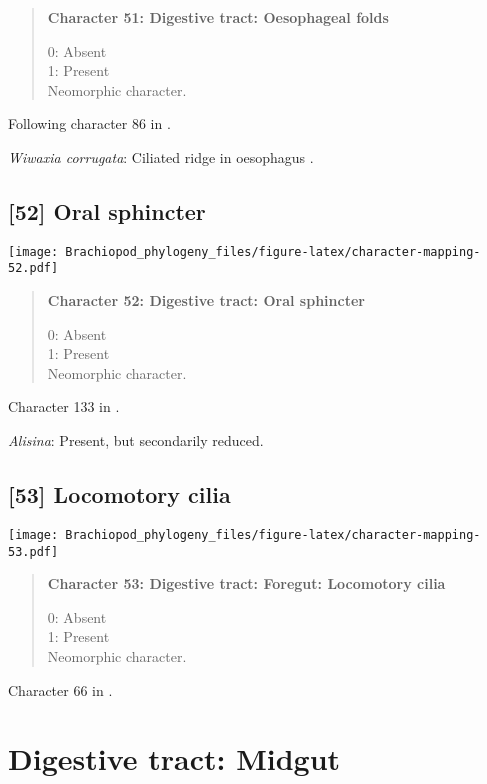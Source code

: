 \documentclass[openany]{book}
\theoremstyle{definition}
\theoremstyle{definition}
\theoremstyle{definition}
\theoremstyle{remark}
\begin{document}
\begin{quote}
\textbf{Character 51: Digestive tract: Oesophageal folds}

0: Absent\\
1: Present\\
Neomorphic character.
\end{quote}

Following character 86 in \citet{Giribet2002}.

\hypertarget{Wiwaxia_corrugata-coding-51}{}
\emph{Wiwaxia corrugata}: Ciliated ridge in oesophagus
\citep{Torrey1901}.

\subsection*{{[}52{]} Oral sphincter}\label{oral-sphincter}

\texttt{[image: Brachiopod\_phylogeny\_files/figure-latex/character-mapping-52.pdf]}

\begin{quote}
\textbf{Character 52: Digestive tract: Oral sphincter}

0: Absent\\
1: Present\\
Neomorphic character.
\end{quote}

Character 133 in \citet{Grobe2007}.

\hypertarget{Alisina-coding-52}{}
\emph{Alisina}: Present, but secondarily reduced.

\subsection*{{[}53{]} Locomotory cilia}\label{locomotory-cilia}

\texttt{[image: Brachiopod\_phylogeny\_files/figure-latex/character-mapping-53.pdf]}

\begin{quote}
\textbf{Character 53: Digestive tract: Foregut: Locomotory cilia}

0: Absent\\
1: Present\\
Neomorphic character.
\end{quote}

Character 66 in \citet{Haszprunar2000}.

\section{Digestive tract: Midgut}\label{digestive-tract-midgut}
\end{document}
